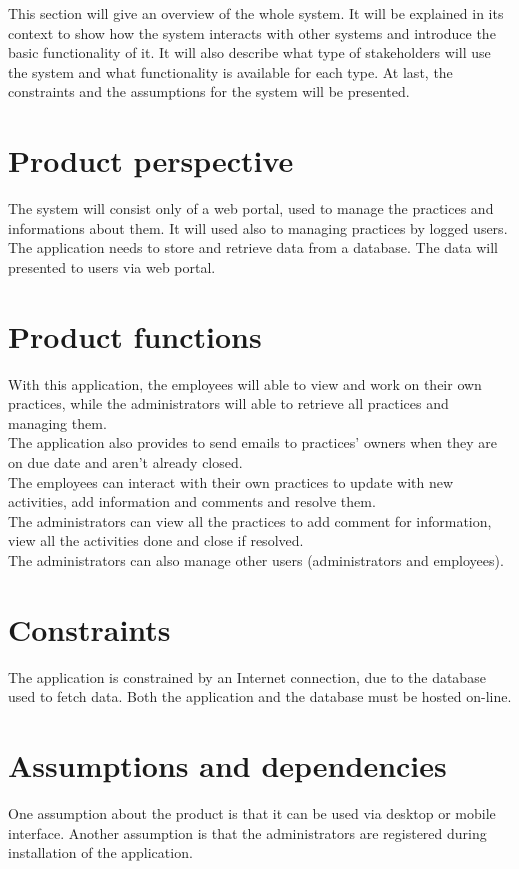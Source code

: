\documentclass[../main.tex]{subfiles}
\begin{document}
	This section will give an overview of the whole system. It will be explained in its context to show how the system interacts with other systems and introduce the basic functionality of it. It will also describe what type of stakeholders will use the system and what functionality  is available for each type. At last, the constraints and the assumptions for the system will be presented.
	\section{Product perspective}
		The system will consist only of a web portal, used to manage the practices and informations about them. It will used also to managing practices by logged users.\\
		The application needs to store and retrieve data from a database. The data will presented to users via web portal.
	\section{Product functions}
		With this application, the employees will able to view and work on their own practices, while the administrators will able to retrieve all practices and managing them.\\
		The application also provides to send emails to practices' owners when they are on due date and aren't already closed.\\
		The employees can interact with their own practices to update with new activities, add information and comments and resolve them.\\
		The administrators can view all the practices to add comment for information, view all the activities done and close if resolved.\\
		The administrators can also manage other users (administrators and employees).
	\section{Constraints}
		The application is constrained by an Internet connection, due to the database used to fetch data. Both the application and the database must be hosted on-line. 
	\section{Assumptions and dependencies}
		One assumption about the product is that it can be used via desktop or mobile interface.
		Another assumption is that the administrators are registered during installation of the application.
\end{document}
